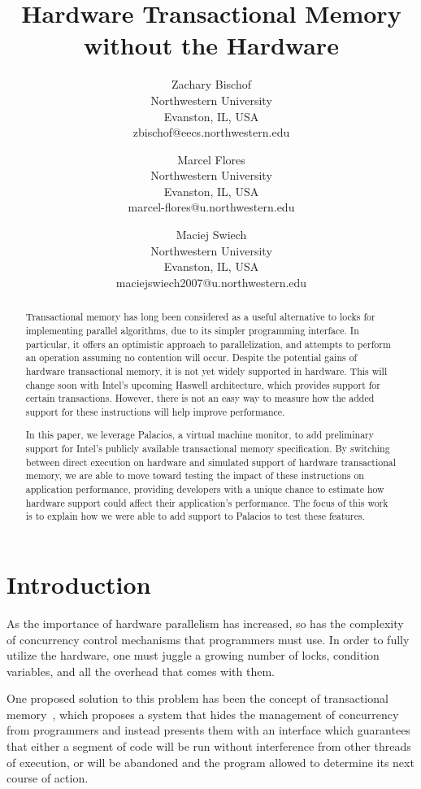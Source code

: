 \documentclass{acm_proc_article-sp}
\title{Hardware Transactional Memory without the Hardware}
\author{Zachary Bischof \\
	Northwestern University\\
	Evanston, IL, USA\\
	zbischof@eecs.northwestern.edu
	\and 
	Marcel Flores \\
	Northwestern University\\
	Evanston, IL, USA\\
	marcel-flores@u.northwestern.edu
	\and
	Maciej Swiech \\
	Northwestern University\\
	Evanston, IL, USA\\
	maciejswiech2007@u.northwestern.edu
    	\titlenote{Authors are listed in alphabetical order.}
        }
\begin{document}
\maketitle

\begin{abstract} 

Transactional memory has long been considered as a useful alternative to locks
for implementing parallel algorithms, due to its simpler programming interface.
In particular, it offers an optimistic approach to parallelization, and
attempts to perform an operation assuming no contention will occur. Despite the
potential gains of hardware transactional memory, it is not yet widely
supported in hardware. This will change soon with Intel's upcoming Haswell
architecture, which provides support for certain transactions. However, there
is not an easy way to measure how the added support for these instructions will
help improve performance.

In this paper, we leverage Palacios, a virtual machine monitor, to add
preliminary support for Intel's publicly available transactional memory
specification. By switching between direct execution on hardware and simulated
support of hardware transactional memory, we are able to move toward testing
the impact of these instructions on application performance, providing
developers with a unique chance to estimate how hardware support could affect
their application's performance. The focus of this work is to explain how we
were able to add support to Palacios to test these features.  

\end{abstract}

\section{Introduction} 

As the importance of hardware parallelism has increased, so has the complexity
of concurrency control mechanisms that programmers must use. In order to fully
utilize the hardware, one must juggle a growing number of locks, condition
variables, and all the overhead that comes with them.

One proposed solution to this problem has been the concept of transactional
memory~\cite{Herlihy:1993:TMA:173682.165164}, which proposes a system that
hides the management of concurrency from programmers and instead presents them
with an interface which guarantees that either a segment of code will be run
without interference from other threads of execution, or will be abandoned and
the program allowed to determine its next course of action.
\end{document}

